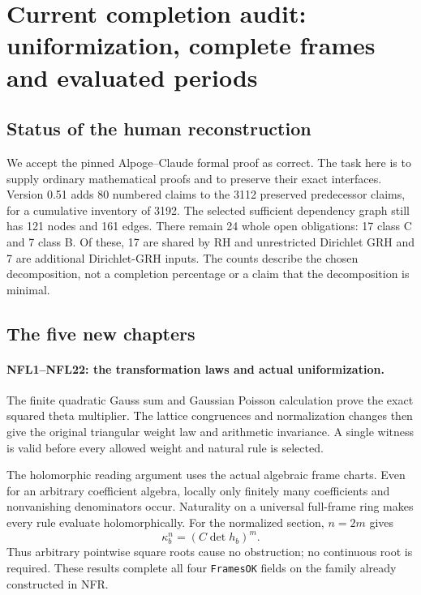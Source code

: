 \section{Current completion audit: uniformization, complete frames and evaluated periods}
\label{sec:dependency-audit-v51}

\subsection{Status of the human reconstruction}

We accept the pinned Alpoge--Claude formal proof as correct. The task
here is to supply ordinary mathematical proofs and to preserve their
exact interfaces. Version 0.51 adds 80 numbered claims to the
3112 preserved predecessor claims, for a cumulative inventory of
3192. The selected sufficient dependency graph still has 121 nodes
and 161 edges. There remain 24 whole open obligations: 17 class C
and 7 class B. Of these, 17 are shared by RH and unrestricted
Dirichlet GRH and 7 are additional Dirichlet-GRH inputs.
The counts describe the chosen decomposition, not a completion
percentage or a claim that the decomposition is minimal.

\subsection{The five new chapters}

\paragraph{NFL1--NFL22: the transformation laws and actual uniformization.}
The finite quadratic Gauss sum and Gaussian Poisson calculation prove
the exact squared theta multiplier. The lattice congruences and
normalization changes then give the original triangular weight law
and arithmetic invariance. A single witness is valid before every
allowed weight and natural rule is selected.

The holomorphic reading argument uses the actual algebraic frame
charts. Even for an arbitrary coefficient algebra, locally only
finitely many coefficients and nonvanishing denominators occur.
Naturality on a universal full-frame ring makes every rule evaluate
holomorphically. For the normalized section, $n=2m$ gives
\[
 \kappa_b^n=(C\det h_b)^m.
\]
Thus arbitrary pointwise square roots cause no obstruction; no
continuous root is required. These results complete all four
\texttt{Frames\allowbreak OK} fields on the family already constructed in NFR.

